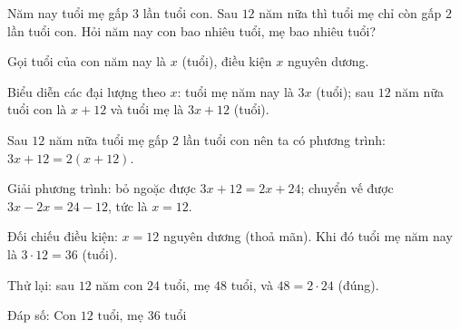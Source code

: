 \begin{problem}[8DS-PT1-006]
Năm nay tuổi mẹ gấp $3$ lần tuổi con. Sau $12$ năm nữa thì tuổi mẹ chỉ còn gấp $2$ lần tuổi con. Hỏi năm nay con bao nhiêu tuổi, mẹ bao nhiêu tuổi?

\begin{solution}
Gọi tuổi của con năm nay là $x$ (tuổi), điều kiện $x$ nguyên dương.

Biểu diễn các đại lượng theo $x$: tuổi mẹ năm nay là $3x$ (tuổi); sau $12$ năm nữa tuổi con là $x + 12$ và tuổi mẹ là $3x + 12$ (tuổi).

Sau $12$ năm nữa tuổi mẹ gấp $2$ lần tuổi con nên ta có phương trình: $3x + 12 = 2(x + 12)$.

Giải phương trình: bỏ ngoặc được $3x + 12 = 2x + 24$; chuyển vế được $3x - 2x = 24 - 12$, tức là $x = 12$.

Đối chiếu điều kiện: $x = 12$ nguyên dương (thoả mãn). Khi đó tuổi mẹ năm nay là $3 \cdot 12 = 36$ (tuổi).

Thử lại: sau $12$ năm con $24$ tuổi, mẹ $48$ tuổi, và $48 = 2 \cdot 24$ (đúng).

Đáp số: $\boxed{\text{Con } 12 \text{ tuổi, mẹ } 36 \text{ tuổi}}$
\end{solution}
\end{problem}

